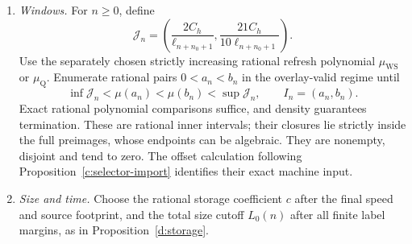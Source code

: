 \begin{enumerate}[label=\arabic*.]
\item \emph{Windows.} For \(n\ge0\), define
\begin{equation}\label{eq:windows}
 \mathcal J_n=\left(\frac{2C_h}{\ell_{n+n_0+1}},
            \frac{21C_h}{10\ell_{n+n_0+1}}\right).
\end{equation}
Use the separately chosen strictly increasing rational refresh polynomial
\(\mu_{\mathrm{WS}}\) or \(\mu_{\mathrm Q}\). Enumerate rational pairs
\(0<a_n<b_n\) in the overlay-valid regime until
\[
 \inf \mathcal J_n<\mu(a_n)<\mu(b_n)<\sup \mathcal J_n,
 \qquad I_n=(a_n,b_n).
\]
Exact rational polynomial comparisons suffice, and density guarantees
termination. These are rational inner intervals; their closures lie
strictly inside the full preimages, whose endpoints can be algebraic.
They are nonempty, disjoint and tend to zero. The offset calculation
following Proposition~\ref{c:selector-import} identifies their exact
machine input.
\item \emph{Size and time.} Choose the rational storage coefficient \(c\) after
the final speed and source footprint, and the total size cutoff \(L_0(n)\)
after all finite label margins, as in Proposition~\ref{d:storage}.
\end{enumerate}
